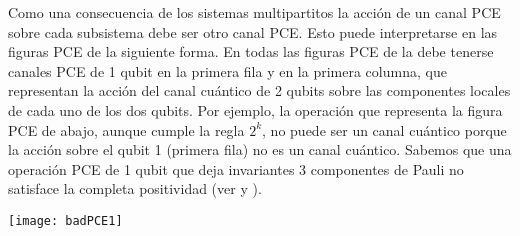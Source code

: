 Como una consecuencia de los sistemas multipartitos la acción de
un canal PCE sobre cada subsistema debe ser otro canal PCE. Esto puede 
interpretarse en las figuras PCE de la siguiente forma. En todas las figuras PCE
de la  debe tenerse canales PCE de 1 qubit 
en la primera fila y en la primera columna, que representan la acción del 
canal cuántico de 2 qubits sobre las componentes locales de cada uno de los dos 
qubits. Por ejemplo, la operación que representa la figura PCE de abajo, aunque 
cumple la regla $2^k$, no puede ser un canal cuántico porque la acción 
sobre el qubit 1 (primera fila) no es un canal cuántico. Sabemos que 
una operación PCE de 1 qubit que deja invariantes 3 componentes de Pauli
no satisface la completa positividad (ver  y ).
\begin{center}
	\texttt{[image: badPCE1]}
\end{center}


